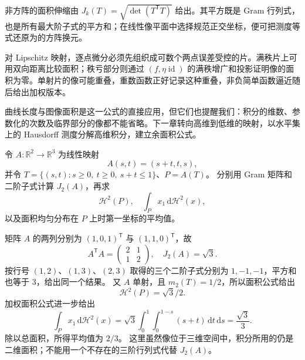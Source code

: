 



\begin{chaptersummary}
非方阵的面积伸缩由 \(J_k(T)=\sqrt{\det(T^{\mathsf T}T)}\) 给出。其平方既是 Gram 行列式，也是所有最大阶子式的平方和；在线性像平面中选择规范正交坐标，便可把测度等式还原为的方阵换元。

\ProseParagraphBreak

对 Lipschitz 映射，逐点微分必须先组织成可数个两点误差受控的片。满秩片上可用双向距离比较面积；秩亏部分则通过 \((f,\eta\operatorname{id})\) 的满秩增广和投影证明像的面积为零。单射片的像可能重叠，重数函数正好记录这种重叠，非负简单函数逼近随后给出加权版本。

\ProseParagraphBreak

曲线长度与图像面积是这一公式的直接应用，但它们也提醒我们：积分的维数、参数化的次数及临界部分的像都不能省略。下一章转向高维到低维的映射，以水平集上的 Hausdorff 测度分解高维积分，建立余面积公式。
\end{chaptersummary}


\BookExercises


\begin{exercise}\label{b1:ex:17-nonsquare-linear-area}
令 \(A:\mathbb R^2\to\mathbb R^3\) 为线性映射
\[
 A(s,t)=(s+t,t,s),
\]
并令 \(T=\{(s,t):s\ge0,\ t\ge0,\ s+t\le1\}\)、\(P=A(T)\)。
分别用 Gram 矩阵和二阶子式计算 \(J_2(A)\)，再求
\[
 \mathcal H^2(P),
 \quad \int_P x_1\,\mathrm d\mathcal H^2(x),
\]
以及面积均匀分布在 \(P\) 上时第一坐标的平均值。
\end{exercise}
\begin{solution}
矩阵 \(A\) 的两列分别为 \((1,0,1)^{\mathsf T}\) 与 \((1,1,0)^{\mathsf T}\)，故
\[
 A^{\mathsf T}A=\begin{pmatrix}2&1\\1&2\end{pmatrix},
 \quad J_2(A)=\sqrt3.
\]
按行号 \((1,2)\)、\((1,3)\)、\((2,3)\) 取得的三个二阶子式分别为 \(1,-1,-1\)，平方和也等于 \(3\)，给出同一个结果。
又 \(A\) 单射，且 \(m_2(T)=1/2\)，所以面积公式给出
\[
 \mathcal H^2(P)=\sqrt3/2.
\]
加权面积公式进一步给出
\[
 \int_Px_1\,\mathrm d\mathcal H^2(x)
 =\sqrt3\int_0^1\int_0^{1-s}(s+t)\,\mathrm dt\,\mathrm ds
 =\frac{\sqrt3}{3}.
\]
除以总面积，所得平均值为 \(2/3\)。
这里虽然像位于三维空间中，积分所用的仍是二维面积；不能用一个不存在的三阶行列式代替 \(J_2(A)\)。
\end{solution}

